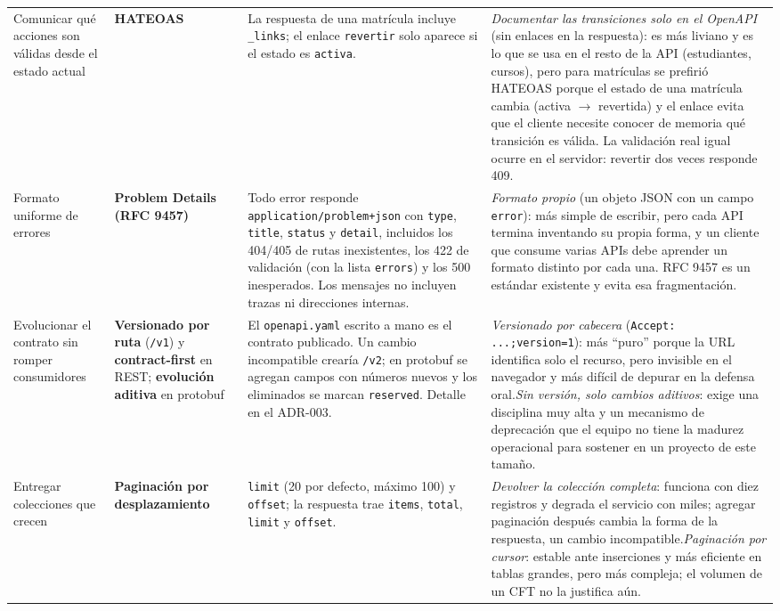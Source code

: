 \documentclass[11pt,spanish]{article}
\begin{document}
\begin{xltabular}{\textwidth}{p{2.4cm} p{2.4cm} X X}
\addlinespace
Comunicar qué acciones son válidas desde el estado actual & \textbf{HATEOAS}~\cite{richardson} & La respuesta de una matrícula incluye \texttt{\_links}; el enlace \texttt{revertir} solo aparece si el estado es \texttt{activa}. & \textit{Documentar las transiciones solo en el OpenAPI} (sin enlaces en la respuesta): es más liviano y es lo que se usa en el resto de la API (estudiantes, cursos), pero para matrículas se prefirió HATEOAS porque el estado de una matrícula cambia (activa $\to$ revertida) y el enlace evita que el cliente necesite conocer de memoria qué transición es válida. La validación real igual ocurre en el servidor: revertir dos veces responde 409. \\
\addlinespace
Formato uniforme de errores & \textbf{Problem Details (RFC 9457)}~\cite{rfc9457} & Todo error responde \texttt{application/problem+json} con \texttt{type}, \texttt{title}, \texttt{status} y \texttt{detail}, incluidos los 404/405 de rutas inexistentes, los 422 de validación (con la lista \texttt{errors}) y los 500 inesperados. Los mensajes no incluyen trazas ni direcciones internas. & \textit{Formato propio} (un objeto JSON con un campo \texttt{error}): más simple de escribir, pero cada API termina inventando su propia forma, y un cliente que consume varias APIs debe aprender un formato distinto por cada una. RFC 9457 es un estándar existente y evita esa fragmentación. \\
\addlinespace
Evolucionar el contrato sin romper consumidores & \textbf{Versionado por ruta} (\texttt{/v1}) y \textbf{contract-first} en REST; \textbf{evolución aditiva} en protobuf & El \texttt{openapi.yaml} escrito a mano es el contrato publicado. Un cambio incompatible crearía \texttt{/v2}; en protobuf se agregan campos con números nuevos y los eliminados se marcan \texttt{reserved}. Detalle en el ADR-003. & \textit{Versionado por cabecera} (\texttt{Accept: ...;version=1}): más ``puro'' porque la URL identifica solo el recurso, pero invisible en el navegador y más difícil de depurar en la defensa oral.\newline \textit{Sin versión, solo cambios aditivos}: exige una disciplina muy alta y un mecanismo de deprecación que el equipo no tiene la madurez operacional para sostener en un proyecto de este tamaño. \\
\addlinespace
Entregar colecciones que crecen & \textbf{Paginación por desplazamiento} & \texttt{limit} (20 por defecto, máximo 100) y \texttt{offset}; la respuesta trae \texttt{items}, \texttt{total}, \texttt{limit} y \texttt{offset}. & \textit{Devolver la colección completa}: funciona con diez registros y degrada el servicio con miles; agregar paginación después cambia la forma de la respuesta, un cambio incompatible.\newline \textit{Paginación por cursor}: estable ante inserciones y más eficiente en tablas grandes, pero más compleja; el volumen de un CFT no la justifica aún. \\

\end{xltabular}
\end{document}
